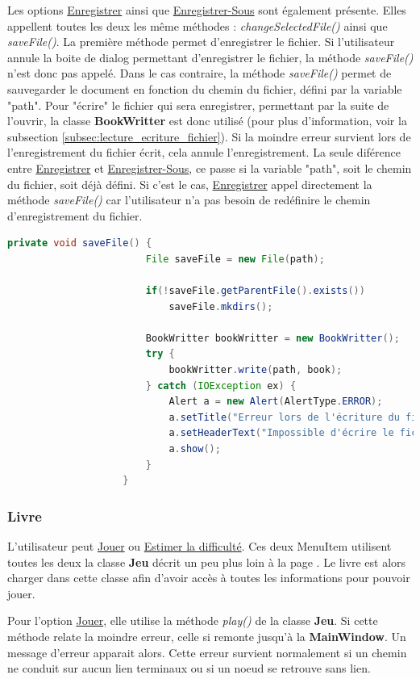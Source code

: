 				Les options \underline{Enregistrer} ainsi que \underline{Enregistrer-Sous} sont également présente. Elles appellent toutes les deux les même méthodes : \textit{changeSelectedFile()} ainsi que \textit{saveFile()}. La première méthode permet d'enregistrer le fichier. Si l'utilisateur annule la boite de dialog permettant d'enregistrer le fichier, la méthode \textit{saveFile()} n'est donc pas appelé. Dans le cas contraire, la méthode \textit{saveFile()} permet de sauvegarder le document en fonction du chemin du fichier, défini par la variable "path". Pour "écrire" le fichier qui sera enregistrer, permettant par la suite de l'ouvrir, la classe \textbf{BookWritter} est donc utilisé (pour plus d'information, voir la subsection \ref{subsec:lecture_ecriture_fichier}). Si la moindre erreur survient lors de l'enregistrement du fichier écrit, cela annule l'enregistrement.
				La seule diférence entre \underline{Enregistrer} et \underline{Enregistrer-Sous}, ce passe si la variable "path", soit le chemin du fichier, soit déjà défini. Si c'est le cas, \underline{Enregistrer} appel directement la méthode \textit{saveFile()} car l'utilisateur n'a pas besoin de redéfinire le chemin d'enregistrement du fichier.

				\begin{lstlisting}[gobble=12, language=java, caption=Enregistrement du livre]
					private void saveFile() {
						File saveFile = new File(path);

						if(!saveFile.getParentFile().exists())
							saveFile.mkdirs();

						BookWritter bookWritter = new BookWritter();
						try {
							bookWritter.write(path, book);
						} catch (IOException ex) {
							Alert a = new Alert(AlertType.ERROR);
							a.setTitle("Erreur lors de l'écriture du fichier");
							a.setHeaderText("Impossible d'écrire le fichier sur le disque");
							a.show();
						}
					}
				\end{lstlisting}

			\subsubsection{Livre}
				L'utilisateur peut \underline{Jouer} ou \underline{Estimer la difficulté}. Ces deux MenuItem utilisent toutes les deux la classe \textbf{Jeu} décrit un peu plus loin  à la page \pageref{sec:Jeu}. Le livre est alors charger dans cette classe afin d'avoir accès à toutes les informations pour pouvoir jouer.

				Pour l'option \underline{Jouer}, elle utilise la méthode \textit{play()} de la classe \textbf{Jeu}. Si cette méthode relate la moindre erreur, celle si remonte jusqu'à la \textbf{MainWindow}. Un message d'erreur apparait alors. Cette erreur survient normalement si un chemin ne conduit sur aucun lien terminaux ou si un noeud se retrouve sans lien.

